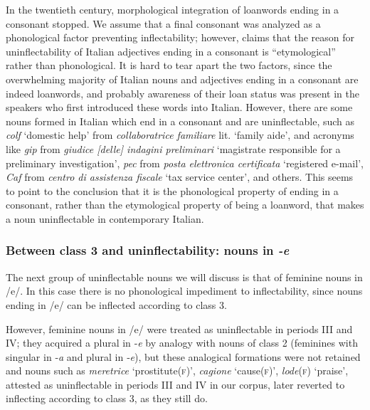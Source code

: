 \documentclass[output=paper,colorlinks,citecolor=brown]{langscibook}
\begin{document}
In the twentieth century, morphological integration of loanwords ending in a consonant stopped. We assume that a final consonant was analyzed as a phonological factor preventing inflectability; however, \citet{fedden2019} claims that the reason for uninflectability of Italian adjectives ending in a consonant is ``etymological'' rather than phonological. It is hard to tear apart the two factors, since the overwhelming majority of Italian nouns and adjectives ending in a consonant are indeed loanwords, and probably awareness of their loan status was present in the speakers who first introduced these words into Italian. However, there are some nouns formed in Italian which end in a consonant and are uninflectable, such as \emph{colf} `domestic help' from \emph{collaboratrice familiare} lit. `family aide', and acronyms like \emph{gip} from \emph{giudice [delle] indagini preliminari} `magistrate responsible for a preliminary investigation', \emph{pec} from \emph{posta elettronica certificata} `registered e-mail', \emph{Caf} from \emph{centro di assistenza fiscale} `tax service center', and others. This seems to point to the conclusion that it is the phonological property of ending in a consonant, rather than the etymological property of being a loanword, that makes a noun uninflectable in contemporary Italian.

\subsubsection{Between class 3 and uninflectability: nouns in \emph{-e}}

The next group of uninflectable nouns we will discuss is that of feminine nouns in /e/. In this case there is no phonological impediment to inflectability, since nouns ending in /e/ can be inflected according to class 3.

However, feminine nouns in /e/ were treated as uninflectable in periods III and IV; they acquired a plural in ‑\emph{e} by analogy with nouns of class 2 (feminines with singular in ‑\emph{a} and plural in ‑\emph{e}), but these analogical formations were not retained and nouns such as \emph{meretrice} `prostitute(\textsc{f})', \emph{cagione} `cause(\textsc{f})', \emph{lode}(\textsc{f}) `praise', attested as uninflectable in periods III and IV in our corpus, later reverted to inflecting according to class 3, as they still do.
\end{document}
